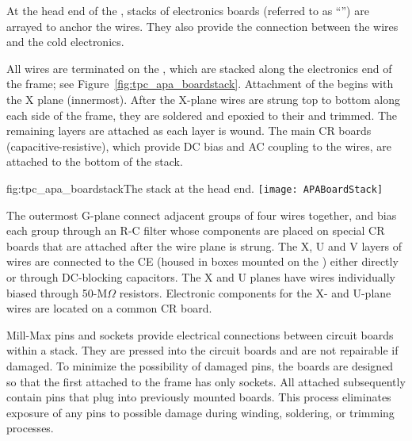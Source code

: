 At the head end of the  , stacks of electronics boards (referred to as ``'') are arrayed to anchor the wires.  They also provide the connection between the wires and the cold electronics.

All   wires are terminated on the , which are stacked along the electronics end of the   frame; see Figure~\ref{fig:tpc_apa_boardstack}. 
Attachment of the  begins with the X plane (innermost). After the X-plane wires are strung top to bottom along each side of the   frame, they are soldered and epoxied to their  and trimmed. The remaining  layers are attached as each layer is wound.  The main CR boards (capacitive-resistive), which provide DC bias and AC coupling to the wires, are attached to the bottom of the  stack. 

\begin{dunefigure}{fig:tpc_apa_boardstack}{The    stack at the head end.}
\texttt{[image: APABoardStack]}
\end{dunefigure}

The outermost G-plane  connect adjacent groups of four wires together, and bias each group through an R-C filter whose components are placed on special CR boards   
that are attached after the wire plane is strung. The X, U and V layers of wires are connected to the CE (housed in boxes mounted on the  ) either directly or through DC-blocking capacitors. The X and U planes have wires individually biased through 50-M$\Omega$ resistors. Electronic components for the X- and U-plane wires are located on a common CR board. 

Mill-Max pins and sockets provide electrical connections between circuit boards within a stack. They are pressed into the circuit boards and are not repairable if damaged. To minimize the possibility of damaged pins, the boards are designed so that the first  attached to the frame has only sockets. All  attached subsequently contain pins that plug into previously mounted boards. This process eliminates exposure of any pins to possible damage during winding, soldering, or trimming processes.

